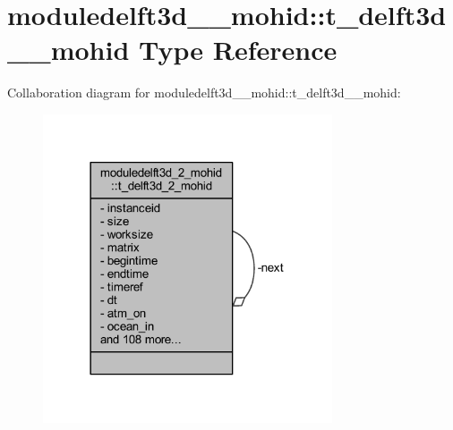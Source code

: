 \hypertarget{structmoduledelft3d__2__mohid_1_1t__delft3d__2__mohid}{}\section{moduledelft3d\+\_\+\_\+mohid\+:\+:t\+\_\+delft3d\+\_\+\_\+mohid Type Reference}
\label{structmoduledelft3d__2__mohid_1_1t__delft3d__2__mohid}


Collaboration diagram for moduledelft3d\+\_\+\_\+mohid\+:\+:t\+\_\+delft3d\+\_\+\_\+mohid\+:\nopagebreak
\begin{figure}[H]
\begin{center}
\leavevmode
\includegraphics[width=242pt]{structmoduledelft3d__2__mohid_1_1t__delft3d__2__mohid__coll__graph}
\end{center}
\end{figure}
